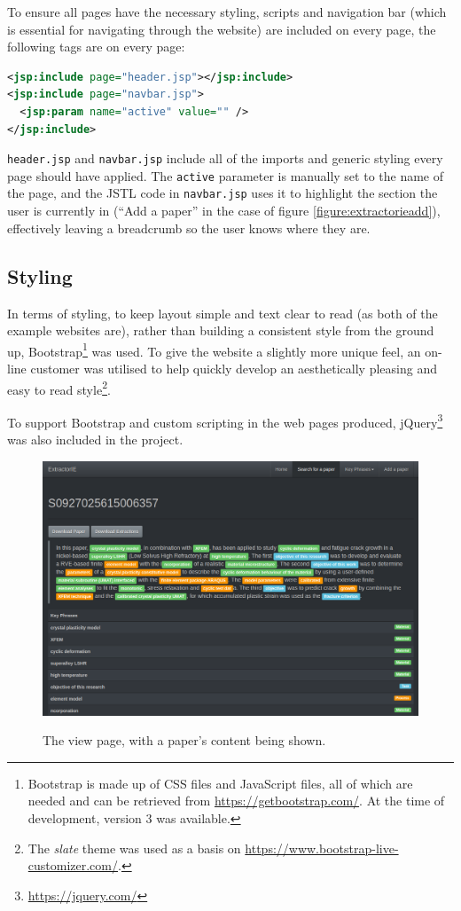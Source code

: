 To ensure all pages have the necessary styling, scripts and navigation bar (which is essential for navigating through the website) are included on every page, the following tags are on every page:

\begin{lstlisting}[language=XML]
<jsp:include page="header.jsp"></jsp:include>
<jsp:include page="navbar.jsp">
  <jsp:param name="active" value="" />
</jsp:include>
\end{lstlisting}

\texttt{header.jsp} and \texttt{navbar.jsp} include all of the imports and generic styling every page should have applied. The \texttt{active} parameter is manually set to the name of the page, and the JSTL code in \texttt{navbar.jsp} uses it to highlight the section the user is currently in (``Add a paper'' in the case of figure \ref{figure:extractorieadd}), effectively leaving a breadcrumb so the user knows where they are.

\subsection*{Styling}
In terms of styling, to keep layout simple and text clear to read (as both of the example websites are), rather than building a consistent style from the ground up, Bootstrap\footnote{Bootstrap is made up of CSS files and JavaScript files, all of which are needed and can be retrieved from \href{https://getbootstrap.com/}{https://getbootstrap.com/}. At the time of development, version 3 was available.} was used. To give the website a slightly more unique feel, an on-line customer was utilised to help quickly develop an aesthetically pleasing and easy to read style\footnote{The \textit{slate} theme was used as a basis on \href{https://www.bootstrap-live-customizer.com/}{https://www.bootstrap-live-customizer.com/}.}.

To support Bootstrap and custom scripting in the web pages produced, jQuery\footnote{\href{https://jquery.com/}{https://jquery.com/}} was also included in the project.

\begin{figure}[t]
	\centering
	\includegraphics[width=12cm]{img/extractorie-view.png} \\
	\caption[An Example Paper View on the Website]{The view page, with a paper's content being shown.}
	\label{figure:extractorieview}
\end{figure}

